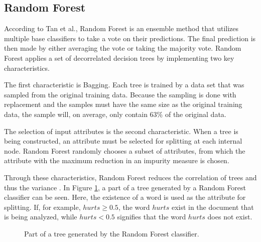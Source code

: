 \subsection{Random Forest}
        According to Tan et al., Random Forest is an ensemble method that utilizes multiple base classifiers to take a vote on their predictions. The final prediction is then made by either averaging the vote or taking the majority vote. Random Forest applies a set of decorrelated decision trees by implementing two key characteristics.
        
        The first characteristic is Bagging. Each tree is trained by a data set that was sampled from the original training data. Because the sampling is done with replacement and the samples must have the same size as the original training data, the sample will, on average, only contain 63\% of the original data.
        
        The selection of input attributes is the second characteristic. When a tree is being constructed, an attribute must be selected for splitting at each internal node.
        Random Forest randomly chooses a subset of attributes, from which the attribute with the maximum reduction in an impurity measure is chosen.
        
        Through these characteristics, Random Forest reduces the correlation of trees and thus the variance \cite{DBLP:books/aw/TanSKK2019}. In Figure \ref{fig:tree}, a part of a tree generated by a Random Forest classifier can be seen. Here, the existence of a word is used as the attribute for splitting. If, for example, $hurts \geq 0.5$, the word $hurts$ exist in the document that is being analyzed, while $hurts < 0.5$ signifies that the word $hurts$ does not exist.
        
        \begin{figure}[h!]
        \centering
    \caption{Part of a tree generated by the Random Forest classifier.}
      \label{fig:tree}
\end{figure}
